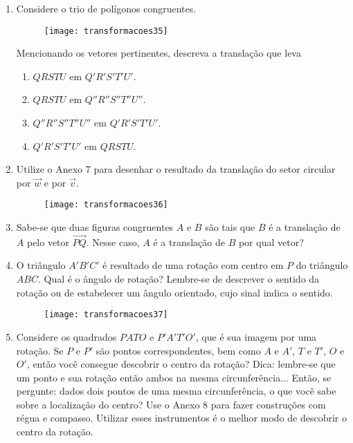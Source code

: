 \begin{enumerate}
\item Considere o trio de polígonos congruentes. 

\begin{figure}[H]
\centering

\texttt{[image: transformacoes35]}
\end{figure}

Mencionando os vetores pertinentes, descreva a translação que leva
\begin{enumerate}
\item $QRSTU$ em $Q'R'S'T'U'$. 
\item $QRSTU$ em $Q''R''S''T''U''$.
\item $Q''R''S''T''U''$ em $Q'R'S'T'U'$.
\item $Q'R'S'T'U'$ em $QRSTU$.

\end{enumerate}

\item Utilize o Anexo 7 para desenhar o resultado da translação do setor circular por $\overrightarrow{w}$ e por $\overrightarrow{v}$.

\begin{figure}[H]
\centering

\texttt{[image: transformacoes36]}
\end{figure}

\item Sabe-se que duas figuras congruentes $A$ e $B$ são tais que $B$ é a translação de $A$ pelo vetor $\overrightarrow{PQ}$. Nesse caso, $A$ é a translação de $B$ por qual vetor?

\item O triângulo $A'B'C'$ é resultado de uma rotação com centro em $P$ do triângulo $ABC$. Qual é o ângulo de rotação? Lembre-se de descrever o sentido da rotação ou de estabelecer um ângulo orientado, cujo sinal indica o sentido.

\begin{figure}[H]
\centering

\texttt{[image: transformacoes37]}
\end{figure}

\item Considere os quadrados $PATO$ e $P'A'T'O'$, que é sua imagem por uma rotação. Se $P$ e $P'$ são pontos correspondentes, bem como $A$ e $A'$, $T$ e $T'$, $O$ e $O'$, então você consegue descobrir o centro da rotação? Dica: lembre-se que um ponto e sua rotação então ambos na mesma circunferência... Então, se pergunte: dados dois pontos de uma mesma circunferência, o que você sabe sobre a localização do centro? Use o Anexo 8 para fazer construções com régua e compasso. Utilizar esses instrumentos é o melhor modo de descobrir o centro da rotação.


\end{enumerate}
